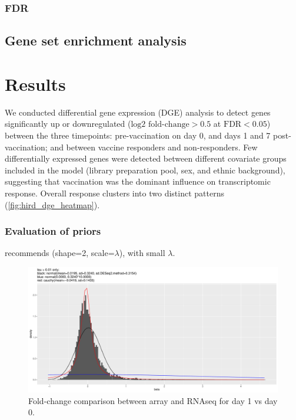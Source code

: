 \subsubsection{FDR}



\subsection{Gene set enrichment analysis}


\section{Results}

We conducted differential gene expression (DGE) analysis to detect genes significantly up or downregulated ($\text{log2 fold-change} > 0.5$ at $\text{FDR} < 0.05$) between the three timepoints: pre-vaccination on day 0, and days 1 and 7 post-vaccination; and between vaccine responders and non-responders.
Few differentially expressed genes were detected between different covariate groups included in the model (library preparation pool, sex, and ethnic background), suggesting that vaccination was the dominant influence on transcriptomic response.
Overall response clusters into two distinct patterns (\autoref{fig:hird_dge_heatmap}).

\subsubsection{Evaluation of priors}

\autocite{chung2013NondegeneratePenalizedLikelihood} recommends (shape=2, scale=$\lambda$), with small $\lambda$.

\begin{figure}
    \includegraphics[width=1.0\textwidth,page=1]{mainmatter/figures/chapter_02/meta.bayesmeta.priors.coefName_d1.vs.d0.pdf}
    \caption{Fold-change comparison between array and RNAseq for day 1 vs day 0.}
    \label{fig:hird_dgeMeta_fcComparison}
\end{figure}


